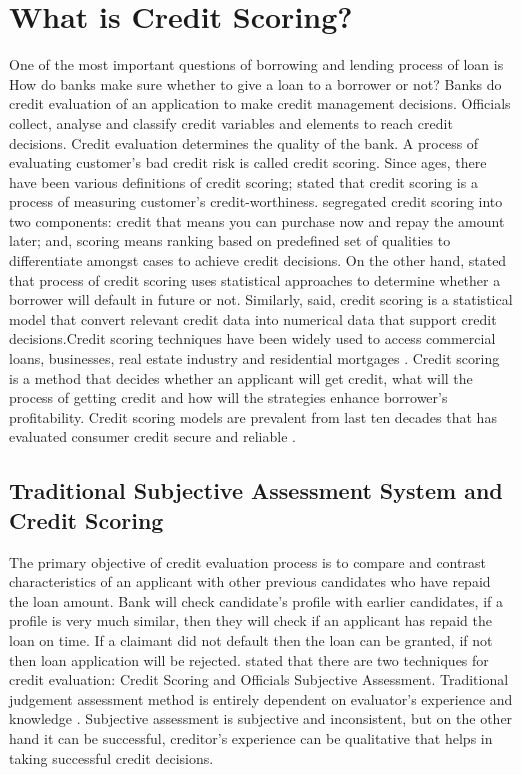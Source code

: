 {\section{What is Credit Scoring?}\label{C.risk}
One of the most important questions of borrowing and lending process of loan is How do banks make sure whether to give a loan to a borrower or not? Banks do credit evaluation of an application to make credit management decisions. Officials collect, analyse and classify credit variables and elements to reach credit decisions. Credit evaluation determines the quality of the bank. A process of evaluating customer's bad credit risk is called credit scoring. Since ages, there have been various definitions of credit scoring; \citet{hand1998consumer} stated that credit scoring is a process of measuring customer's credit-worthiness. \citet{anderson2007credit} segregated credit scoring into two components: credit that means you can purchase now and repay the amount later; and, scoring means ranking based on predefined set of qualities to differentiate amongst cases to achieve credit decisions. On the other hand, \citet{gup2005commercial} stated that process of credit scoring uses statistical approaches to determine whether a borrower will default in future or not. Similarly, \citet{beynon2005optimizing} said, credit scoring is a statistical model that convert relevant credit data into numerical data that support credit decisions.Credit scoring techniques have been widely used to access commercial loans, businesses, real estate industry and residential mortgages \citep{gup2005commercial}. Credit scoring is a method that decides whether an applicant will get credit, what will the process of getting credit and how will the strategies enhance borrower's profitability. Credit scoring models are prevalent from last ten decades that has evaluated consumer credit secure and reliable \citep{thomas2002credit}. 

\subsection{Traditional Subjective Assessment System and Credit Scoring}\label{C.risk2}
The primary objective of credit evaluation process is to compare and contrast characteristics of an applicant with other previous candidates who have repaid the loan amount. Bank will check candidate's profile with earlier candidates, if a profile is very much similar, then they will check if an applicant has repaid the loan on time. If a claimant did not default then the loan can be granted, if not then loan application will be rejected. \citet{crook1996credit} stated that there are two techniques for credit evaluation: Credit Scoring and Officials Subjective Assessment. Traditional judgement assessment method is entirely dependent on evaluator's experience and knowledge \citep{sullivan1981consumer,bailey2004consumer}. Subjective assessment is subjective and inconsistent, but on the other hand it can be successful, creditor's experience can be qualitative that helps in taking successful credit decisions.\\

}

